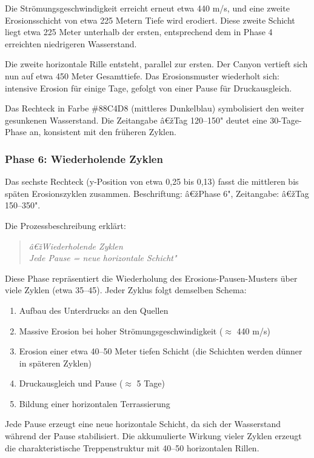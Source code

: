 Die Strömungsgeschwindigkeit erreicht erneut etwa 440 m/s, und eine zweite Erosionsschicht von etwa 225 Metern Tiefe wird erodiert. Diese zweite Schicht liegt etwa 225 Meter unterhalb der ersten, entsprechend dem in Phase 4 erreichten niedrigeren Wasserstand.

Die zweite horizontale Rille entsteht, parallel zur ersten. Der Canyon vertieft sich nun auf etwa 450 Meter Gesamttiefe. Das Erosionsmuster wiederholt sich: intensive Erosion für einige Tage, gefolgt von einer Pause für Druckausgleich.

Das Rechteck in Farbe \#88C4D8 (mittleres Dunkelblau) symbolisiert den weiter gesunkenen Wasserstand. Die Zeitangabe â€žTag 120--150" deutet eine 30-Tage-Phase an, konsistent mit den früheren Zyklen.

\subsubsection*{Phase 6: Wiederholende Zyklen}

Das sechste Rechteck (y-Position von etwa 0,25 bis 0,13) fasst die mittleren bis späten Erosionszyklen zusammen. Beschriftung: â€žPhase 6", Zeitangabe: â€žTag 150--350".

Die Prozessbeschreibung erklärt:
\begin{quote}
\textit{â€žWiederholende Zyklen\\
Jede Pause = neue horizontale Schicht"}
\end{quote}

Diese Phase repräsentiert die Wiederholung des Erosions-Pausen-Musters über viele Zyklen (etwa 35--45). Jeder Zyklus folgt demselben Schema:
\begin{enumerate}
    \item Aufbau des Unterdrucks an den Quellen
    \item Massive Erosion bei hoher Strömungsgeschwindigkeit ($\approx$ 440 m/s)
    \item Erosion einer etwa 40--50 Meter tiefen Schicht (die Schichten werden dünner in späteren Zyklen)
    \item Druckausgleich und Pause ($\approx$ 5 Tage)
    \item Bildung einer horizontalen Terrassierung
\end{enumerate}

Jede Pause erzeugt eine neue horizontale Schicht, da sich der Wasserstand während der Pause stabilisiert. Die akkumulierte Wirkung vieler Zyklen erzeugt die charakteristische Treppenstruktur mit 40--50 horizontalen Rillen.

